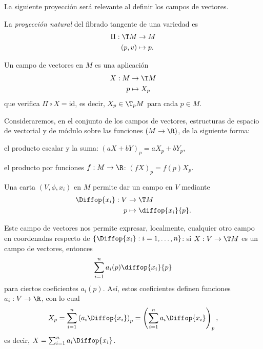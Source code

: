 La siguiente proyección será relevante al definir los campos de vectores.
\begin{ndef}
  La \emph{proyección natural} del fibrado tangente de una variedad es
  \begin{alignat*}{2}
    \Pi: \T M & \to M \\
   (p,v) & \mapsto p.
  \end{alignat*}
\end{ndef}

\begin{ndef}
  Un campo de vectores en $M$ es una aplicación
  \begin{alignat*}{2}
    X: M & \to \T M \\
   p & \mapsto X_{p}
  \end{alignat*}
  que verifica $\Pi\circ X=\mathrm{id}$, es decir, $X_{p}\in \T_{p}M$ para cada
  $p\in M$.
\end{ndef}

Consideraremos, en el conjunto de los campos de vectores, estructuras de espacio
de vectorial y de módulo sobre las funciones $(M\to \R)$, de la siguiente forma:
\begin{nlist}
\item
  el producto escalar y la suma: $(aX+bY)_{p} = aX_{p}+bY_{p}$,
\item
  el producto por funciones $f: M\to\R$: $(fX)_{p} = f(p)X_{p}$.
\end{nlist}

\begin{ejemplo}
  Una carta $(V,\phi,x_{i})$ en $M$ permite dar un campo en $V$ mediante
  \begin{alignat*}{2}
    \Diffop{x_{i}}: V  & \to \T M \\
    p & \mapsto \diffop{x_{i}}{p}.
  \end{alignat*}
\end{ejemplo}
Este campo de vectores nos permite expresar, localmente, cualquier otro campo en
coordenadas respecto de $\left\{ \Diffop{x_{i}} : i=1,\dots,n \right\}$: si $X:
V \to \T M$ es un campo de vectores, entonces
\[
  \sum_{i=1}^{n} a_{i}(p)\diffop{x_{i}}{p}
\]
para ciertos coeficientes $a_{i}(p)$. Así, estos coeficientes definen funciones
$a_{i}: V\to\R$, con lo cual
\[
  X_{p} = \sum_{i=1}^{n}\left( a_{i}\Diffop{x_{i}} \right)_{p} = \left(
    \sum_{i=1}^{n} a_{i} \Diffop{x_{i}} \right)_{p}
,\]
es decir, $X = \sum_{i=1}^{n}a_{i}\Diffop{x_{i}}$.

